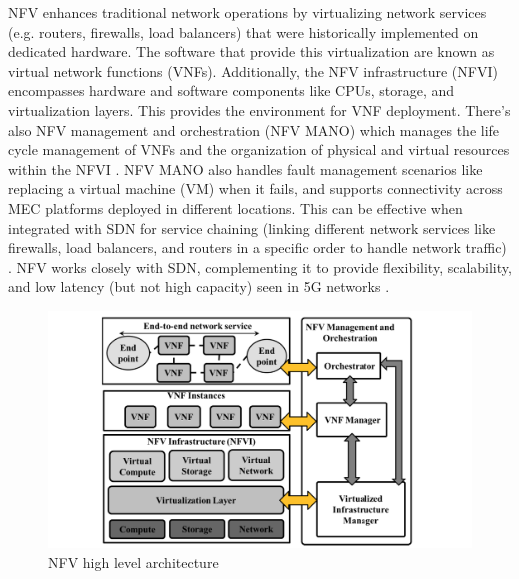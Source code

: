 \documentclass[acmtog]{acmart}
\begin{document}
NFV enhances traditional network operations by virtualizing network services (e.g. routers, firewalls, load balancers) that were historically implemented on dedicated hardware. The software that provide this virtualization are known as virtual network functions (VNFs). Additionally, the NFV infrastructure (NFVI) encompasses hardware and software components like CPUs, storage, and virtualization layers. This provides the environment for VNF deployment. There's also NFV management and orchestration (NFV MANO) which manages the life cycle management of VNFs and the organization of physical and virtual resources within the NFVI \cite{ref6_1}. NFV MANO also handles fault management scenarios like replacing a virtual machine (VM) when it fails, and supports connectivity across MEC platforms deployed in different locations. This can be effective when integrated with SDN for service chaining (linking different network services like firewalls, load balancers, and routers in a specific order to handle network traffic) \cite{ref6_1}. NFV works closely with SDN, complementing it to provide flexibility, scalability, and low latency (but not high capacity) seen in 5G networks \cite{ref6}.
\begin{figure}[h]
  \centering
  \includegraphics[width=\linewidth]{nfv.png}
  \caption{NFV high level architecture \cite{ref7_1}}
\end{figure}
\end{document}
